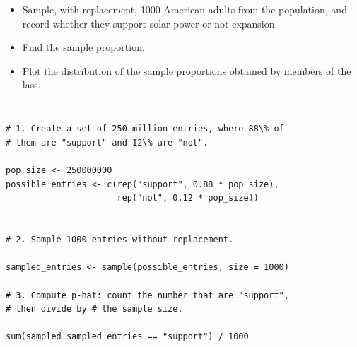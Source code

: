 \begin{frame}
\frametitle{}


\begin{itemize}

\item Sample, with replacement, 1000 American adults from the population, and record whether they support solar power or not expansion.

\item Find the sample proportion.

\item Plot the distribution of the sample proportions obtained by members of the lass.

\end{itemize}

\end{frame}


\begin{frame}[fragile]
\frametitle{}

\begin{beamerboxesrounded}[shadow = true, lower = code body]{}
{
\small 
\begin{verbatim}

# 1. Create a set of 250 million entries, where 88\% of 
# them are "support" and 12\% are "not".

pop_size <- 250000000
possible_entries <- c(rep("support", 0.88 * pop_size), 
                      rep("not", 0.12 * pop_size))


# 2. Sample 1000 entries without replacement.

sampled_entries <- sample(possible_entries, size = 1000)

# 3. Compute p-hat: count the number that are "support", 
# then divide by # the sample size.

sum(sampled sampled_entries == "support") / 1000

\end{verbatim}
}
\end{beamerboxesrounded}

\end{frame}

